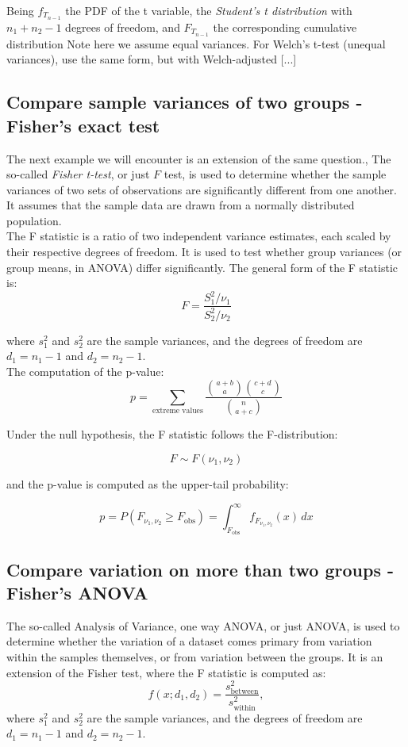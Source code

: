\documentclass{book}
\begin{document}
Being $f_{T_{n-1}}$ the PDF of the t variable, the \textit{Student's t distribution} with $n_1 + n_2 - 1$ degrees of freedom, and $F_{T_{n-1}}$ the corresponding cumulative distribution
Note here we assume equal variances. For Welch’s t-test (unequal variances), use the same form, but with Welch-adjusted [...]

\newpage

\subsection{Compare sample variances of two groups - Fisher's exact test}

The next example we will encounter is an extension of the same question., The so-called \textit{Fisher t-test}, or just $F$ test, is used to determine whether the sample variances of two sets of observations are significantly different from one another. It assumes that the sample data are drawn from a normally distributed population.\\

The F statistic is a ratio of two independent variance estimates, each scaled by their respective degrees of freedom. It is used to test whether group variances (or group means, in ANOVA) differ significantly. The general form of the F statistic is:
\[
F = \frac{S_1^2 / \nu_1}{S_2^2 / \nu_2}
\]

where $s_1^{2}$ and $s_2^{2}$ are the sample variances, and the degrees of freedom are $d_1 = n_1 - 1$ and $d_2 = n_2 - 1$.\\

The computation of the p-value:
\[
p = \sum_{\text{extreme values}} \frac{\binom{a+b}{a} \binom{c+d}{c}}{\binom{n}{a+c}}
\]

Under the null hypothesis, the F statistic follows the F-distribution:

\[
F \sim F(\nu_1, \nu_2)
\]

and the p-value is computed as the upper-tail probability:

\[
p = P(F_{\nu_1, \nu_2} \geq F_{\text{obs}}) = \int_{F_{\text{obs}}}^{\infty} f_{F_{\nu_1, \nu_2}}(x)\,dx
\]

\newpage

\subsection{Compare variation on more than two groups - Fisher's ANOVA}

The so-called Analysis of Variance, one way ANOVA, or just ANOVA, is used to determine whether the variation of a dataset comes primary from variation within the samples themselves, or from variation between the groups. It is an extension of the Fisher test, where the F statistic is computed as:
\[
    f(x; d_{1}, d_{2}) = \frac{s_\text{between}^{2}}{s_\text{within}^{2}},
\]
where $s_1^{2}$ and $s_2^{2}$ are the sample variances, and the degrees of freedom are $d_1 = n_1 - 1$ and $d_2 = n_2 - 1$.\\
\end{document}
